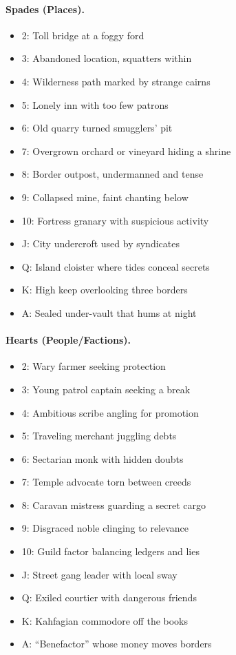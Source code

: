\documentclass[12pt]{article}
\begin{document}
\paragraph{Spades (Places).}
\begin{itemize}
  \item 2: Toll bridge at a foggy ford
  \item 3: Abandoned location, squatters within
  \item 4: Wilderness path marked by strange cairns
  \item 5: Lonely inn with too few patrons
  \item 6: Old quarry turned smugglers’ pit
  \item 7: Overgrown orchard or vineyard hiding a shrine
  \item 8: Border outpost, undermanned and tense
  \item 9: Collapsed mine, faint chanting below
  \item 10: Fortress granary with suspicious activity
  \item J: City undercroft used by syndicates
  \item Q: Island cloister where tides conceal secrets
  \item K: High keep overlooking three borders
  \item A: Sealed under-vault that hums at night
\end{itemize}

\paragraph{Hearts (People/Factions).}
\begin{itemize}
  \item 2: Wary farmer seeking protection
  \item 3: Young patrol captain seeking a break
  \item 4: Ambitious scribe angling for promotion
  \item 5: Traveling merchant juggling debts
  \item 6: Sectarian monk with hidden doubts
  \item 7: Temple advocate torn between creeds
  \item 8: Caravan mistress guarding a secret cargo
  \item 9: Disgraced noble clinging to relevance
  \item 10: Guild factor balancing ledgers and lies
  \item J: Street gang leader with local sway
  \item Q: Exiled courtier with dangerous friends
  \item K: Kahfagian commodore off the books
  \item A: ``Benefactor'' whose money moves borders
\end{itemize}
\end{document}
